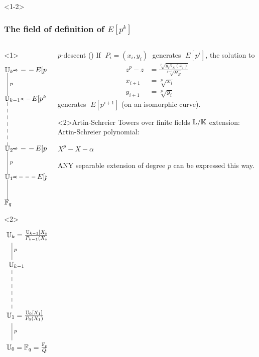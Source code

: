 \documentclass[10pt,usepdftitle=false]{beamer}
\begin{document}
\begin{frame}<1-2>
  \frametitle{The field of definition of $E[p^k]$}
  
  \begin{columns}
    \begin{column}{0.3\textwidth}
      \begin{overlayarea}{\textwidth}{0.9\textheight}
        \begin{onlyenv}<1>
          \large\[\xymatrix@C=20pt{
            *[r]{\U_k} \ar@{-}[d]^p & E[p^k] \ar@{-->}[l]\\
            *[r]{\U_{k-1}} \ar@{--}[dd] & E[p^{k-1}] \ar@{-->}[l]\\
            \\
            *[r]{\U_2} \ar@{-}[d]^p & E[p^2] \ar@{-->}[l]\\
            *[r]{\U_1} \ar@{-}[d] & E[p] \ar@{-->}[l]\\
            *[r]{\F_q}
          }\]
        \end{onlyenv}
        \begin{onlyenv}<2>
          \Large\[\xymatrix{
            *+[r]{\U_k = \frac{\U_{k-1}[X_k]}{P_{k-1}(X_k)}}\ar@{-}[d]^p\\
            *+[r]{\U_{k-1}} \ar@{--}[dd]\\
            \\
            *+[r]{\U_{1} = \frac{\U_0[X_1]}{P_0(X_1)}} \ar@{-}[d]^p\\
            *+[r]{\U_{0} = \F_q = \frac{\F_p[X_0]}{Q(X_0)}}
          }\]
        \end{onlyenv}
      \end{overlayarea}
    \end{column}
    \begin{column}{0.65\textwidth}
      \begin{block}{$p$-descent (\cite{voloch90})}
        If $\;P_i=(x_i,y_i)\;$ generates $\;E[p^i]$, the solution to
        \begin{align*}
          z^p - z &= \frac{\sqrt[p]{y_i\beta_E(x_i)}}{\sqrt[p-1]{H_E}}\\
          x_{i+1} &= \sqrt[p]{x_i}\\
          y_{i+1} &= \sqrt[p]{y_i}
        \end{align*}
        generates $\;E[p^{i+1}]$ (on an isomorphic curve).
      \end{block}

      \begin{block}<2>{Artin-Schreier Towers over finite fields}
        $\mathbb{L}/\mathbb{K}$ extension: Artin-Schreier polynomial:
        \vspace{-.5mm}
        \begin{center}
          \large\emph{$X^p - X - \alpha$}
        \end{center}
        \vspace{-.5mm}
        \alert{ANY} separable extension of degree $p$ can be expressed
        this way.
      \end{block}
    \end{column}
  \end{columns}
\end{frame}
\end{document}
